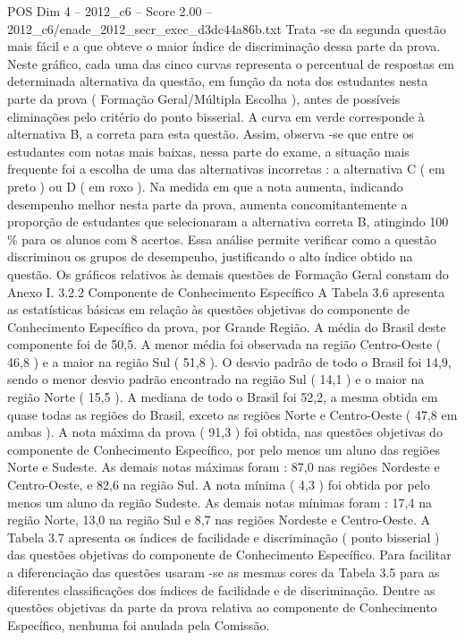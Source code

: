 \begin{textsample}{POS Dim 4 – 2012\_c6 – Score 2.00 – 2012\_c6/enade\_2012\_secr\_exec\_d3dc44a86b.txt}
Trata -se da segunda questão mais fácil e a que obteve o maior índice de discriminação dessa parte da prova.
Neste gráfico, cada uma das cinco curvas representa o percentual de respostas em determinada alternativa da questão, em função da nota dos estudantes nesta parte da prova ( Formação Geral/Múltipla Escolha ), antes de possíveis eliminações pelo critério do ponto bisserial.
A curva em verde corresponde à alternativa B, a correta para esta questão.
Assim, observa -se que entre os estudantes com notas mais baixas, nessa parte do exame, a situação mais frequente foi a escolha de uma das alternativas incorretas : a alternativa C ( em preto ) ou D ( em roxo ).
Na medida em que a nota aumenta, indicando desempenho melhor nesta parte da prova, aumenta concomitantemente a proporção de estudantes que selecionaram a alternativa correta B, atingindo 100 \% para os alunos com 8 acertos.
Essa análise permite verificar como a questão discriminou os grupos de desempenho, justificando o alto índice obtido na questão.
Os gráficos relativos às demais questões de Formação Geral constam do Anexo I. 3.2.2 Componente de Conhecimento Específico A Tabela 3.6 apresenta as estatísticas básicas em relação às questões objetivas do componente de Conhecimento Específico da prova, por Grande Região.
A média do Brasil deste componente foi de 50,5.
A menor média foi observada na região Centro-Oeste ( 46,8 ) e a maior na região Sul ( 51,8 ).
O desvio padrão de todo o Brasil foi 14,9, sendo o menor desvio padrão encontrado na região Sul ( 14,1 ) e o maior na região Norte ( 15,5 ).
A mediana de todo o Brasil foi 52,2, a mesma obtida em quase todas as regiões do Brasil, exceto as regiões Norte e Centro-Oeste ( 47,8 em ambas ).
A nota máxima da prova ( 91,3 ) foi obtida, nas questões objetivas do componente de Conhecimento Específico, por pelo menos um aluno das regiões Norte e Sudeste.
As demais notas máximas foram : 87,0 nas regiões Nordeste e Centro-Oeste, e 82,6 na região Sul.
A nota mínima ( 4,3 ) foi obtida por pelo menos um aluno da região Sudeste.
As demais notas mínimas foram : 17,4 na região Norte, 13,0 na região Sul e 8,7 nas regiões Nordeste e Centro-Oeste.
A Tabela 3.7 apresenta os índices de facilidade e discriminação ( ponto bisserial ) das questões objetivas do componente de Conhecimento Específico.
Para facilitar a diferenciação das questões usaram -se as mesmas cores da Tabela 3.5 para as diferentes classificações dos índices de facilidade e de discriminação.
Dentre as questões objetivas da parte da prova relativa ao componente de Conhecimento Específico, nenhuma foi anulada pela Comissão.

\end{textsample}
